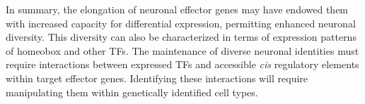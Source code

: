 In summary, the elongation of neuronal effector genes may have endowed them with increased capacity for differential expression, permitting enhanced neuronal diversity. This diversity can also be characterized in terms of expression patterns of homeobox and other TFs. The maintenance of diverse neuronal identities must require interactions between expressed TFs and accessible \textit{cis} regulatory elements within target effector genes. Identifying these interactions will require manipulating them within genetically identified cell types.   



